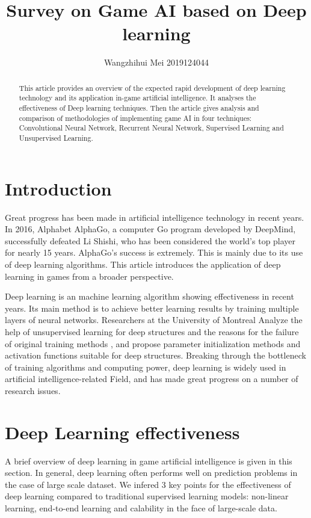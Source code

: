 \documentclass[11pt,en]{elegantpaper}
\title{Survey on Game AI based on Deep learning}
\author{Wangzhihui Mei 2019124044}
\institute{CCNU-UOW JI}
\date{}
\begin{document}
\maketitle

\begin{abstract}
	This article provides an overview of the expected rapid development of deep learning technology and its application in-game artificial intelligence. It analyses the effectiveness of Deep learning techniques. Then the article gives analysis and comparison of methodologies of implementing game AI in four techniques: Convolutional Neural Network, Recurrent Neural Network, Supervised Learning and Unsupervised Learning. 	
\end{abstract}

\section{Introduction}
Great progress has been made in artificial intelligence technology in recent years. In 2016, Alphabet AlphaGo, a computer Go program developed by DeepMind, successfully defeated Li Shishi, who has been considered the world's top player for nearly 15 years. AlphaGo's success is extremely. This is mainly due to its use of deep learning algorithms. This article introduces the application of deep learning in games from a broader perspective.
 
Deep learning is an machine learning algorithm showing effectiveness in recent years. Its main method is to achieve better learning results by training multiple layers of neural networks. Researchers at the University of Montreal Analyze the help of unsupervised learning for deep structures \cite{9} and the reasons for the failure of original training methods \cite{10}, and propose parameter initialization methods and activation functions \cite{11} suitable for deep structures. Breaking through the bottleneck of training algorithms and computing power, deep learning is widely used in artificial intelligence-related Field, and has made great progress on a number of research issues. 

\section{Deep Learning effectiveness}
A brief overview of deep learning in game artificial intelligence is given in this section. In general, deep learning often performs well on prediction problems in the case of large scale dataset. We infered 3 key points for the effectiveness of deep learning compared to traditional supervised learning models: non-linear learning, end-to-end learning and calability in the face of large-scale data.
\end{document}
